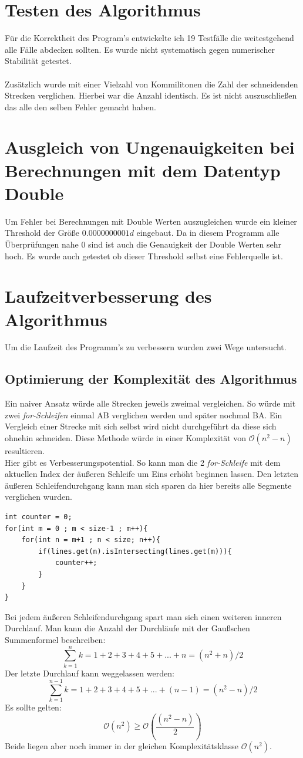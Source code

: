 \documentclass[conference]{IEEEtran}
\begin{document}
\section{Testen des Algorithmus}
Für die Korrektheit des Program's entwickelte ich 19 Testfälle die weitestgehend alle Fälle abdecken sollten. Es wurde nicht systematisch gegen numerischer Stabilität getestet.\\
\\
Zusätzlich wurde mit einer Vielzahl von Kommilitonen die Zahl der schneidenden Strecken verglichen. Hierbei war die Anzahl identisch. Es ist nicht auszuschließen das alle den selben Fehler gemacht haben.

\section{Ausgleich von Ungenauigkeiten bei Berechnungen mit dem Datentyp Double}
Um Fehler bei Berechnungen mit Double Werten auszugleichen wurde ein kleiner Threshold der Größe $0.0000000001d$ eingebaut. Da in diesem Programm alle Überprüfungen nahe 0 sind ist auch die Genauigkeit der Double Werten sehr hoch. Es wurde auch getestet ob dieser Threshold selbst eine Fehlerquelle ist.

\section{Laufzeitverbesserung des Algorithmus}
Um die Laufzeit des Programm's zu verbessern wurden zwei Wege untersucht.
\subsection{Optimierung der Komplexität des Algorithmus}
Ein naiver Ansatz würde alle Strecken jeweils zweimal vergleichen. So würde mit zwei \textit{for-Schleifen} einmal AB verglichen werden und später nochmal BA. Ein Vergleich einer Strecke mit sich selbst wird nicht durchgeführt da diese sich ohnehin schneiden. Diese Methode würde in einer Komplexität von $\mathcal{O}(n^2-n)$ resultieren.\\
Hier gibt es Verbesserungspotential. So kann man die 2 \textit{for-Schleife} mit dem aktuellen Index der äußeren Schleife um Eins erhöht beginnen lassen. Den letzten äußeren Schleifendurchgang kann man sich sparen da hier bereits alle Segmente verglichen wurden.
\begin{lstlisting}
int counter = 0;
for(int m = 0 ; m < size-1 ; m++){
	for(int n = m+1 ; n < size; n++){
		if(lines.get(n).isIntersecting(lines.get(m))){
			counter++;
		}
	}
}
\end{lstlisting}
Bei jedem äußeren Schleifendurchgang spart man sich einen weiteren inneren Durchlauf.
Man kann die Anzahl der Durchläufe mit der Gaußschen Summenformel beschreiben:
\[ \sum_{k=1}^{n} k = 1+2+3+4+5+...+n = (n^2 + n) / 2 \]
Der letzte Durchlauf kann weggelassen werden:
\[ \sum_{k=1}^{n-1} k = 1+2+3+4+5+...+(n-1) = (n^2 - n) / 2 \]
Es sollte gelten:
\[ \mathcal{O}(n^2) \geq \mathcal{O}(\frac{(n^2 - n)}{2}) \]
Beide liegen aber noch immer in der gleichen Komplexitätsklasse $\mathcal{O}(n^2)$.
\end{document}
